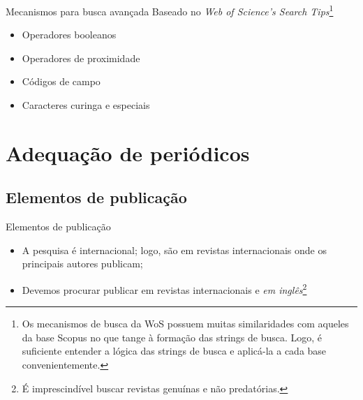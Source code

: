 \begin{frame}{Mecanismos para busca avançada}
Baseado no \textit{Web of Science's Search Tips}\footnote{Os mecanismos de busca da WoS possuem muitas similaridades com aqueles da base Scopus no que tange à formação das strings de busca. Logo, é suficiente entender a lógica das strings de busca e aplicá-la a cada base convenientemente.}
\begin{itemize}
\item Operadores booleanos
\item Operadores de proximidade
\item Códigos de campo 
\item Caracteres curinga e especiais
\end{itemize}
\end{frame}

%


\section{Adequação de periódicos}


\subsection{Elementos de publicação}


\begin{frame}{Elementos de publicação}
\begin{itemize}
\item A pesquisa é internacional; logo, são em revistas internacionais onde os principais autores publicam;
\item Devemos procurar publicar em revistas internacionais e \emph{em inglês}\footnote{É imprescindível buscar revistas genuínas e não predatórias.}
\end{itemize}
\end{frame}

